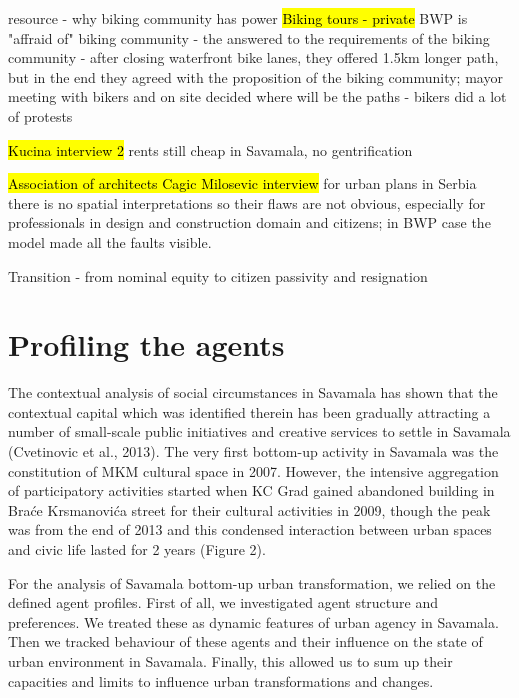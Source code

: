 \documentclass[11pt]{report}
\begin{document}
resource - why biking community has power
\hl{Biking tours - private}
BWP is "affraid of" biking community - the answered to the requirements of the biking community - after closing waterfront bike lanes, they offered 1.5km longer path, but in the end they agreed with the proposition of the biking community; mayor meeting with bikers and on site decided where will be the paths - bikers did a lot of protests

\hl{Kucina interview 2}
rents still cheap in Savamala, no gentrification

\hl{Association of architects Cagic Milosevic interview}
for urban plans in Serbia there is no spatial interpretations so their flaws are not obvious, especially for professionals in design and construction domain and citizens; in BWP case the model made all the faults visible.

Transition - from nominal equity to citizen passivity and resignation

\section{Profiling the agents}

The contextual analysis of social circumstances in Savamala has shown that the contextual capital which was identified therein has been gradually attracting a number of small-scale public initiatives and creative services to settle in Savamala (Cvetinovic et al., 2013). The very first bottom-up activity in Savamala was the constitution of MKM cultural space in 2007. However, the intensive aggregation of participatory activities started when KC Grad gained abandoned building in Braće Krsmanovića street for their cultural activities in 2009, though the peak was from the end of 2013 and this condensed interaction between urban spaces and civic life lasted for 2 years (Figure 2).

For the analysis of Savamala bottom-up urban transformation, we relied on the defined agent profiles. First of all, we investigated agent structure and preferences. We treated these as dynamic features of urban agency in Savamala. Then we tracked behaviour of these agents and their influence on the state of urban environment in Savamala. Finally, this allowed us to sum up their capacities and limits to influence urban transformations and changes.
\end{document}
